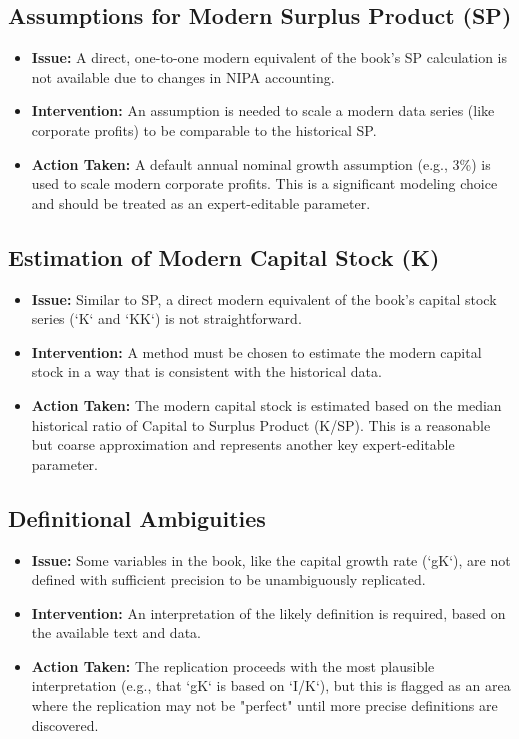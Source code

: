 \documentclass[12pt,a4paper]{article}
\begin{document}
\subsection{Assumptions for Modern Surplus Product (SP)}
\begin{itemize}
    \item \textbf{Issue:} A direct, one-to-one modern equivalent of the book's SP calculation is not available due to changes in NIPA accounting.
    \item \textbf{Intervention:} An assumption is needed to scale a modern data series (like corporate profits) to be comparable to the historical SP.
    \item \textbf{Action Taken:} A default annual nominal growth assumption (e.g., 3\%) is used to scale modern corporate profits. This is a significant modeling choice and should be treated as an expert-editable parameter.
\end{itemize}

\subsection{Estimation of Modern Capital Stock (K)}
\begin{itemize}
    \item \textbf{Issue:} Similar to SP, a direct modern equivalent of the book's capital stock series (`K` and `KK`) is not straightforward.
    \item \textbf{Intervention:} A method must be chosen to estimate the modern capital stock in a way that is consistent with the historical data.
    \item \textbf{Action Taken:} The modern capital stock is estimated based on the median historical ratio of Capital to Surplus Product (K/SP). This is a reasonable but coarse approximation and represents another key expert-editable parameter.
\end{itemize}

\subsection{Definitional Ambiguities}
\begin{itemize}
    \item \textbf{Issue:} Some variables in the book, like the capital growth rate (`gK`), are not defined with sufficient precision to be unambiguously replicated.
    \item \textbf{Intervention:} An interpretation of the likely definition is required, based on the available text and data.
    \item \textbf{Action Taken:} The replication proceeds with the most plausible interpretation (e.g., that `gK` is based on `I/K`), but this is flagged as an area where the replication may not be "perfect" until more precise definitions are discovered.
\end{itemize}
\end{document}

